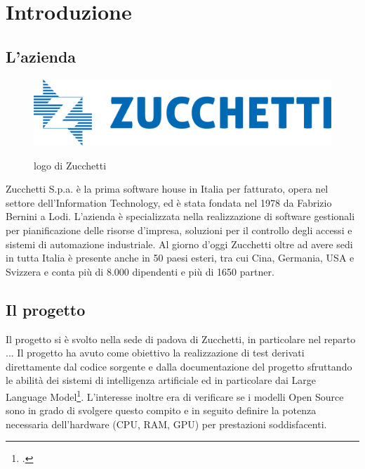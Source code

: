 \chapter{Introduzione}
\label{chap:introduzione}









\section{L'azienda}
\begin{figure}[h!]
    \centering
    \includegraphics[alt={Testo alternativo dell'immagine}, width=0.7\columnwidth]{img/logoZucchetti.jpeg}
    \caption{logo di Zucchetti}
    \label{fig:entanglement}
\end{figure}
Zucchetti S.p.a. è la prima software house in Italia per fatturato, opera nel settore dell'Information Technology, ed è stata fondata nel 1978 da Fabrizio Bernini a Lodi. 
L'azienda è specializzata nella realizzazione di software gestionali per pianificazione delle risorse d'impresa, soluzioni per il controllo degli accessi e sistemi di automazione industriale. 
Al giorno d'oggi Zucchetti oltre ad avere sedi in tutta Italia è presente anche in 50 paesi esteri, tra cui Cina, Germania, USA e Svizzera e conta più di 8.000 dipendenti e più di 1650 partner.


\section{Il progetto}
Il progetto si è svolto nella sede di padova di Zucchetti, in particolare nel reparto ...
Il progetto ha avuto come obiettivo la realizzazione di test derivati direttamente dal codice sorgente e dalla documentazione del progetto 
sfruttando le abilità dei sistemi di intelligenza artificiale ed in particolare dai Large Language Model\footcite{article:spooky}.
L'interesse inoltre era di verificare se i  modelli Open Source sono in grado di svolgere questo compito e in seguito definire la potenza necessaria dell'hardware (CPU, RAM, GPU) per prestazioni soddisfacenti.

